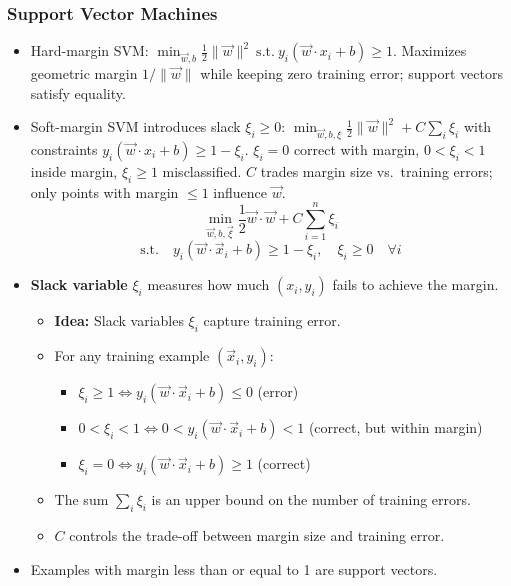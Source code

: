\documentclass[10pt]{article}
\begin{document}
\begin{multicols}{2}
\subsubsection*{Support Vector Machines}
\begin{itemize}
    \item Hard-margin SVM: $\displaystyle \min_{\vec{w},b}\frac{1}{2}\|\vec{w}\|^2\ \text{s.t.}\ y_i(\vec{w}\cdot x_i + b)\ge 1$. Maximizes geometric margin $1/\|\vec{w}\|$ while keeping zero training error; support vectors satisfy equality.
    \item Soft-margin SVM introduces slack $\xi_i\ge0$: $\displaystyle \min_{\vec{w},b,\xi}\frac{1}{2}\|\vec{w}\|^2 + C\sum_i \xi_i$ with constraints $y_i(\vec{w}\cdot x_i + b)\ge 1-\xi_i$. $\xi_i=0$ correct with margin, $0<\xi_i<1$ inside margin, $\xi_i\ge1$ misclassified. $C$ trades margin size vs.\ training errors; only points with margin $\le1$ influence $\vec{w}$.
    \[
        \min_{\vec{w}, b, \vec{\xi}} \frac{1}{2} \vec{w} \cdot \vec{w} + C \sum_{i=1}^n \xi_i
    \]
    \[
        \text{s.t.} \quad y_i(\vec{w} \cdot \vec{x}_i + b) \geq 1 - \xi_i, \quad \xi_i \geq 0 \quad \forall i
    \]
    \item \textbf{Slack variable} $\xi_i$ measures how much $(x_i, y_i)$ fails to achieve the margin.
    \begin{itemize}
        \item \textbf{Idea:} Slack variables $\xi_i$ capture training error.
        \item For any training example $(\vec{x}_i, y_i)$:
        \begin{itemize}
            \item $\xi_i \geq 1 \iff y_i(\vec{w} \cdot \vec{x}_i + b) \leq 0$ (error)
            \item $0 < \xi_i < 1 \iff 0 < y_i(\vec{w} \cdot \vec{x}_i + b) < 1$ (correct, but within margin)
            \item $\xi_i = 0 \iff y_i(\vec{w} \cdot \vec{x}_i + b) \geq 1$ (correct)
        \end{itemize}
        \item The sum $\sum_i \xi_i$ is an upper bound on the number of training errors.
        \item $C$ controls the trade-off between margin size and training error.
    \end{itemize}
    \item Examples with margin less than or equal to 1 are support vectors.
\end{itemize}


\end{multicols}
\end{document}
